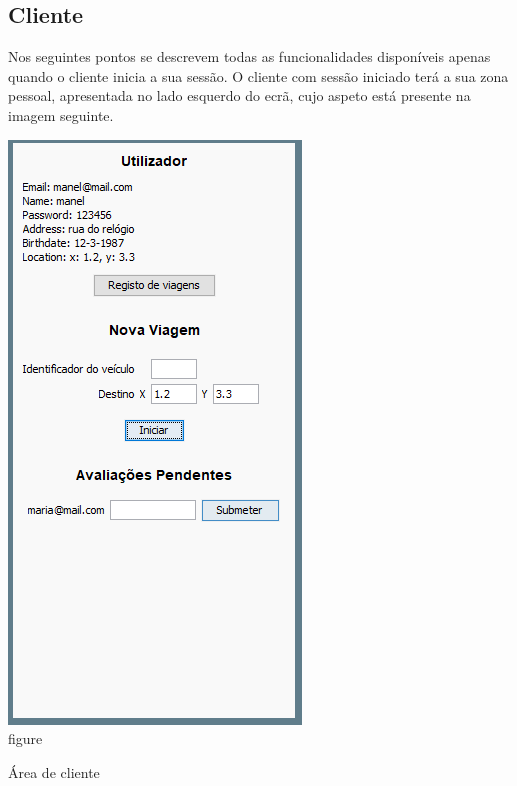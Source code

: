 \documentclass[a4paper]{article}
\begin{document}
\subsection{Cliente}
Nos seguintes pontos se descrevem todas as funcionalidades disponíveis apenas quando o cliente inicia a sua sessão. O cliente com sessão iniciado terá a sua zona pessoal, apresentada no lado esquerdo do ecrã, cujo aspeto está presente na imagem seguinte.
\begin{center}
  \includegraphics[scale=0.70]{janela_cliente}\\
  \caption{figure}{Área de cliente}
  \label{fig:picture}
\end{center}
\end{document}
